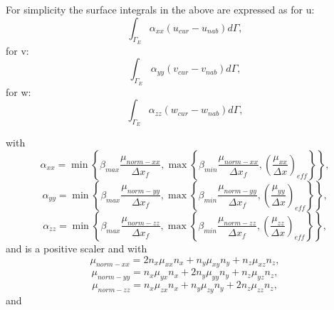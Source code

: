 For simplicity the surface integrals in the above are
expressed as for u:
\begin{equation}
\int_{\Gamma_E} \alpha_{xx} (u_{cur}-u_{nab}) d\Gamma,
\end{equation}
for v:
\begin{equation}
\int_{\Gamma_E} \alpha_{yy} (v_{cur}-v_{nab}) d\Gamma,
\end{equation}
for w:
\begin{equation}
\int_{\Gamma_E} \alpha_{zz} (w_{cur}-w_{nab}) d\Gamma,
\end{equation}

with
\begin{equation}
\alpha_{xx}=
\min\left\{  \beta_{max}\frac{\mu_{norm-xx}}{{\Delta x}_{f}} , \max\left\{ \beta_{min}\frac{\mu_{norm-xx}}{{\Delta x}_{f}} ,
\left( \frac{\mu_{xx}}{\Delta x} \right)_{eff}
\right\} \right\} ,
\label{dg-alpha-xx-def}
\end{equation}
\begin{equation}
\alpha_{yy}=
\min\left\{  \beta_{max}\frac{\mu_{norm-yy}}{{\Delta x}_{f}} , \max\left\{ \beta_{min}\frac{\mu_{norm-yy}}{{\Delta x}_{f}} ,
\left( \frac{\mu_{yy}}{\Delta x} \right)_{eff}
\right\} \right\} ,
\label{dg-alpha-yy-def}
\end{equation}
\begin{equation}
\alpha_{zz}=
\min\left\{  \beta_{max}\frac{\mu_{norm-zz}}{{\Delta x}_{f}} , \max\left\{ \beta_{min}\frac{\mu_{norm-zz}}{{\Delta x}_{f}} ,
\left( \frac{\mu_{zz}}{\Delta x} \right)_{eff}
\right\} \right\} ,
\label{dg-alpha-zz-def}
\end{equation}
and is a positive scaler and with
\begin{equation}
\mu_{norm-xx}=2n_x \mu_{xx}  n_x + n_y \mu_{xy} n_y + n_z \mu_{xz} n_z,
\end{equation}
\begin{equation}
\mu_{norm-yy}=n_x \mu_{yx}  n_x + 2n_y \mu_{yy}  n_y + n_z \mu_{yz} n_z,
\end{equation}
\begin{equation}
\mu_{norm-zz}=n_x \mu_{zx}  n_x + n_y \mu_{zy} n_y + 2n_z \mu_{zz}  n_z,
\end{equation}
and


